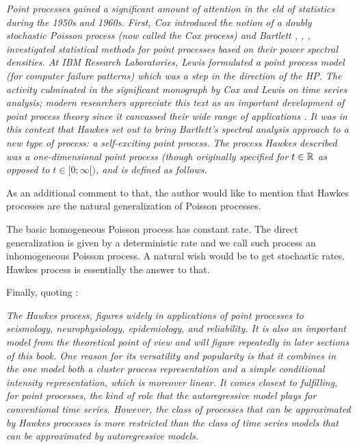 \textit{Point processes gained a significant amount of attention in the eld of statistics during the 1950s and 1960s. First, Cox \cite{hphistorique1} introduced the notion of a doubly stochastic Poisson process (now called the Cox process) and Bartlett \cite{hphistorique2}, \cite{hphistorique3}, \cite{hphistorique4}, investigated statistical methods for point processes based on their power spectral densities. At IBM Research Laboratories, Lewis \cite{hphistorique5} formulated a point process model (for computer failure patterns) which was a step in the direction of the HP. The activity culminated in the significant monograph by Cox and Lewis \cite{hphistorique6} on time series analysis; modern researchers appreciate this text as an important development of point process theory since it canvassed their wide range of applications \cite{Hawkes}. It was in this context that Hawkes \cite{Hawkes} set out to bring Bartlett's spectral analysis approach to a new type of process: a self-exciting point process. The process Hawkes described was a one-dimensional point process (though originally specified for $t \in \mathbb{R}$ as opposed to $t \in [0;\infty[)$, and is defined as follows.}

As an additional comment to that, the author would like to mention that Hawkes processes are the natural generalization of Poisson processes. 

The basic homogeneous Poisson process has constant rate. The direct generalization is given by a deterministic rate and we call such process an inhomogeneous Poisson process. A natural wish would be to get stochastic rates. Hawkes process is essentially the answer to that.

Finally, quoting \cite{daley}:

\textit{The Hawkes process, figures widely in applications of point processes to seismology, neurophysiology, epidemiology, and reliability. It is also an important model from the theoretical point of view and will figure repeatedly in later sections of this book. One reason for its versatility and popularity is that it combines in the one model both a cluster process representation and a simple conditional intensity representation, which is moreover linear. It comes closest to fulfilling, for point processes, the kind of role that the autoregressive model plays for conventional time series. However, the class of processes that can be approximated by Hawkes processes is more restricted than the class of time series models that can be approximated by autoregressive models. }






